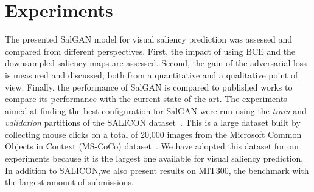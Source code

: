 \documentclass[times,twocolumn,final,authoryear]{elsarticle}
\begin{document}





\section{Experiments}
\label{sec:Experiments}

\par The presented SalGAN model for visual saliency prediction was assessed and compared from different perspectives. First, the impact of using BCE and the downsampled saliency maps are assessed. Second, the gain of the adversarial loss is measured and discussed, both from a quantitative and a qualitative point of view. Finally, the performance of SalGAN is compared to published works to compare its performance with the current state-of-the-art.
The experiments aimed at finding the best configuration for SalGAN were run using the \textit{train} and \textit{validation} partitions of the SALICON dataset~\citep{jiang2015salicon}.
This is a large dataset built by collecting mouse clicks on a total of 20,000 images from the Microsoft Common Objects in Context (MS-CoCo) dataset~\citep{lin2014microsoft}.
We have adopted this dataset for our experiments because it is the largest one available for visual saliency prediction.
In addition to SALICON,we also present results on MIT300, the benchmark with the largest amount of submissions.
\end{document}
